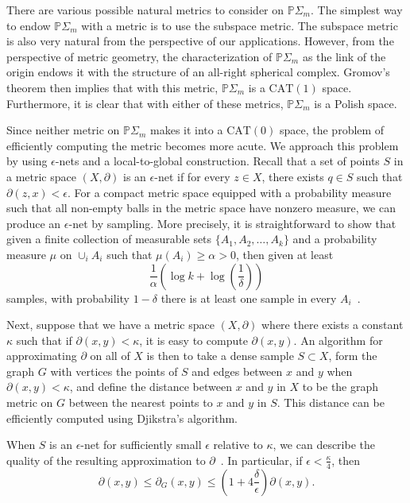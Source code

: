 \documentclass[a4paper,11pt]{article}
\newcommand{\CAT}{\textrm{CAT}}
\begin{document}
There are various possible natural metrics to consider on $\mathbb{P} \Sigma_m$.
The simplest way to endow $\mathbb{P} \Sigma_m$ with a metric is to use the subspace metric.
The subspace metric is also very natural from the perspective of our applications.
However, from the perspective of metric geometry, the characterization of $\mathbb{P} \Sigma_m$ as the link of the origin endows it with the structure of an all-right spherical complex.
Gromov's theorem then implies that with this metric, $\mathbb{P} \Sigma_m$ is a $\CAT(1)$ space.
Furthermore, it is clear that with either of these metrics, $\mathbb{P} \Sigma_m$ is a Polish space.

Since neither metric on $\mathbb{P} \Sigma_m$ makes it into a $\CAT(0)$ space, the problem of efficiently computing the metric becomes more acute.
We approach this problem by using $\epsilon$-nets and a local-to-global construction.
Recall that a set of points $S$ in a metric space $(X,\partial)$ is an $\epsilon$-net if for every $z \in X$, there exists $q \in S$ such that $\partial(z,x) < \epsilon$.
For a compact metric space equipped with a probability measure such that all non-empty balls in the metric space have nonzero measure, we can produce an $\epsilon$-net by sampling.
More precisely, it is straightforward to show that given a finite collection of measurable sets $\{A_1, A_2, \ldots, A_k\}$ and a probability measure $\mu$ on $\cup_i A_i$ such that $\mu(A_i) \geq \alpha > 0$, then given at least 
\[
\frac{1}{\alpha}\left(\log k + \log(\frac{1}{\delta})\right)
\]
samples, with probability $1-\delta$ there is at least one sample in every $A_i$~\cite[5.1]{niyogi2008finding}.

Next, suppose that we have a metric space $(X,\partial)$ where there exists a constant $\kappa$ such that if $\partial(x,y) < \kappa$, it is easy to compute $\partial(x,y)$.
An algorithm for approximating $\partial$ on all of $X$ is then to take a dense sample $S \subset X$, form the graph $G$ with vertices the points of $S$ and edges between $x$ and $y$ when $\partial(x,y) < \kappa$, and define the distance between $x$ and $y$ in $X$ to be the graph metric on $G$ between the nearest points to $x$ and $y$ in $S$.
This distance can be efficiently computed using Djikstra's algorithm.

When $S$ is an $\epsilon$-net for sufficiently small $\epsilon$ relative to $\kappa$, we can describe the quality of the resulting approximation to $\partial$~\cite[Thm. 2]{bernstein2000graph}.
In particular, if $\epsilon < \frac{\kappa}{4}$, then 
\[
\partial(x,y) \leq \partial_G(x,y) \leq (1 + 4\frac{\delta}{\epsilon}) \partial(x,y).
\]
\end{document}
